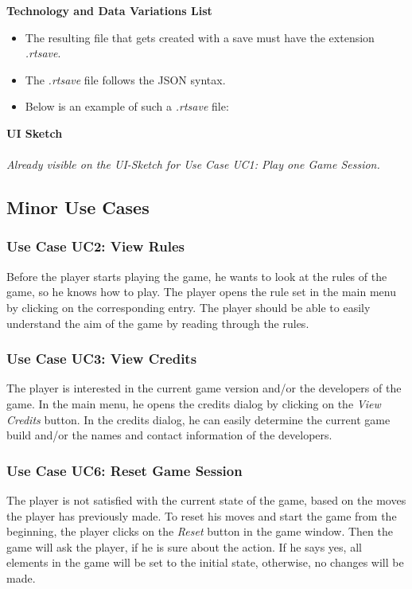 			\textbf{Technology and Data Variations List}
				\begin{itemize}
					\item The resulting file that gets created with a save must have the extension \textit{.rtsave}.
					\item The \textit{.rtsave} file follows the JSON syntax.
					\newpage
					\item Below is an example of such a \textit{.rtsave} file:
					
				\end{itemize}
		
			\textbf{UI Sketch} \\~\\
				\textit{Already visible on the UI-Sketch for Use Case UC1: Play one Game Session.}

	\subsection{Minor Use Cases}

		\subsubsection{Use Case UC2: View Rules}
			Before the player starts playing the game, he wants to look at the rules of the game, so he knows how to play. The player opens the rule set in the main menu by clicking on the corresponding entry. The player should be able to easily understand the aim of the game by reading through the rules.

		\subsubsection{Use Case UC3: View Credits}
			The player is interested in the current game version and/or the developers of the game. In the main menu, he opens the credits dialog by clicking on the \textit{View Credits} button. In the credits dialog, he can easily determine the current game build and/or the names and contact information of the developers.

		\subsubsection{Use Case UC6: Reset Game Session}
			The player is not satisfied with the current state of the game, based on the moves the player has previously made. To reset his moves and start the game from the beginning, the player clicks on the \textit{Reset} button in the game window. Then the game will ask the player, if he is sure about the action. If he says yes, all elements in the game will be set to the initial state, otherwise, no changes will be made.

		